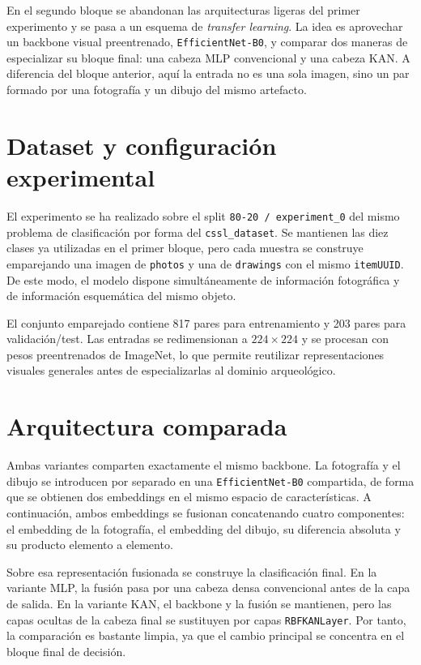 \documentclass[11pt,a4paper]{report}
\begin{document}
En el segundo bloque se abandonan las arquitecturas ligeras del primer experimento y se pasa a un esquema de \textit{transfer learning}. La idea es aprovechar un backbone visual preentrenado, \texttt{EfficientNet-B0}, y comparar dos maneras de especializar su bloque final: una cabeza MLP convencional y una cabeza KAN. A diferencia del bloque anterior, aqu\'i la entrada no es una sola imagen, sino un par formado por una fotograf\'ia y un dibujo del mismo artefacto.

\section{Dataset y configuraci\'on experimental}

El experimento se ha realizado sobre el split \texttt{80-20 / experiment\_0} del mismo problema de clasificaci\'on por forma del \texttt{cssl\_dataset}. Se mantienen las diez clases ya utilizadas en el primer bloque, pero cada muestra se construye emparejando una imagen de \texttt{photos} y una de \texttt{drawings} con el mismo \texttt{itemUUID}. De este modo, el modelo dispone simult\'aneamente de informaci\'on fotogr\'afica y de informaci\'on esquem\'atica del mismo objeto.

El conjunto emparejado contiene 817 pares para entrenamiento y 203 pares para validaci\'on/test. Las entradas se redimensionan a $224\times224$ y se procesan con pesos preentrenados de ImageNet, lo que permite reutilizar representaciones visuales generales antes de especializarlas al dominio arqueol\'ogico.

\section{Arquitectura comparada}

Ambas variantes comparten exactamente el mismo backbone. La fotograf\'ia y el dibujo se introducen por separado en una \texttt{EfficientNet-B0} compartida, de forma que se obtienen dos embeddings en el mismo espacio de caracter\'isticas. A continuaci\'on, ambos embeddings se fusionan concatenando cuatro componentes: el embedding de la fotograf\'ia, el embedding del dibujo, su diferencia absoluta y su producto elemento a elemento.

Sobre esa representaci\'on fusionada se construye la clasificaci\'on final. En la variante MLP, la fusi\'on pasa por una cabeza densa convencional antes de la capa de salida. En la variante KAN, el backbone y la fusi\'on se mantienen, pero las capas ocultas de la cabeza final se sustituyen por capas \texttt{RBFKANLayer}. Por tanto, la comparaci\'on es bastante limpia, ya que el cambio principal se concentra en el bloque final de decisi\'on.
\end{document}
